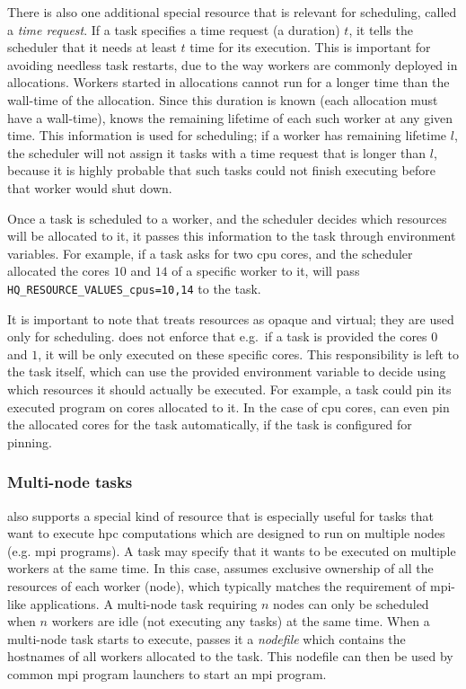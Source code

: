 There is also one additional special resource that is relevant for scheduling, called a
\emph{time request}. If a task specifies a time request (a duration) $t$, it
tells the scheduler that it needs at least $t$ time for its execution. This is
important for avoiding needless task restarts, due to the way \hq{} workers are
commonly deployed in allocations. Workers started in allocations cannot run for a longer time than
the wall-time of the allocation. Since this duration is known (each allocation must have a
wall-time), \hq{} knows the remaining lifetime of each such worker at any given
time. This information is used for scheduling; if a worker has remaining lifetime
$l$, the scheduler will not assign it tasks with a time request that is longer
than $l$, because it is highly probable that such tasks could not finish
executing before that worker would shut down.

Once a task is scheduled to a worker, and the scheduler decides which resources will be allocated
to it, it passes this information to the task through environment variables. For example, if a task
asks for two \gls{cpu} cores, and the scheduler allocated the cores
$10$ and $14$ of a specific worker to it,
\hq{} will pass \texttt{HQ\_RESOURCE\_VALUES\_cpus=10,14} to the task.

It is important to note that \hyperqueue{} treats resources as opaque and virtual; they
are used only for scheduling. \hq{} does not enforce that e.g.\ if a task is
provided the cores $0$ and $1$, it will be only executed on
these specific cores. This responsibility is left to the task itself, which can use the provided
environment variable to decide using which resources it should actually be executed. For example, a
task could pin its executed program on cores allocated to it. In the case of
\gls{cpu} cores, \hq{} can even pin the allocated cores for the
task automatically, if the task is configured for pinning.

\subsubsection*{Multi-node tasks}
\hyperqueue{} also supports a special kind of resource that is especially useful for
tasks that want to execute \gls{hpc} computations which are designed to run on
multiple nodes (e.g. \gls{mpi} programs). A task may specify that it wants to be
executed on multiple workers at the same time. In this case, \hq{} assumes
exclusive ownership of all the resources of each worker (node), which typically matches the
requirement of \gls{mpi}-like applications. A multi-node task requiring
$n$ nodes can only be scheduled when $n$ workers are idle
(not executing any tasks) at the same time. When a multi-node task starts to execute,
\hq{} passes it a \emph{nodefile} which contains the hostnames of all
workers allocated to the task. This nodefile can then be used by common \gls{mpi}
program launchers to start an \gls{mpi} program.

